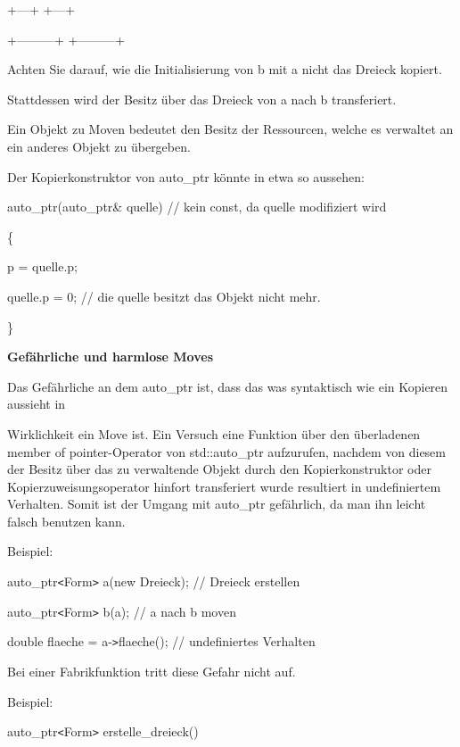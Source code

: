 \documentclass{article}
\begin{document}
\parindent=14pt
\textbar{}   +---+ \textbar{}            \textbar{}   +---+ \textbar{}  

\parindent=7pt
+---------+            +---------+

\vspace{12pt}
\parindent=0pt
Achten Sie darauf, wie die Initialisierung von b mit a nicht das Dreieck kopiert.

Stattdessen wird der Besitz über das Dreieck von a nach b transferiert.

\vspace{12pt}
Ein Objekt zu Moven bedeutet den Besitz der Ressourcen, welche es verwaltet an 
ein anderes Objekt zu übergeben.

\vspace{12pt}
Der Kopierkonstruktor von auto\_ptr könnte in etwa so aussehen:

\vspace{12pt}
auto\_ptr(auto\_ptr\& quelle) // kein const, da quelle modifiziert wird

\{    

\parindent=14pt
p = quelle.p;    

quelle.p = 0; // die quelle besitzt das Objekt nicht mehr.

\}

\vspace{12pt}
\parindent=0pt
\textbf{Gefährliche und harmlose Moves}

Das Gefährliche an dem auto\_ptr ist, dass das was syntaktisch wie ein Kopieren 
aussieht in 

Wirklichkeit ein Move ist. Ein Versuch eine Funktion über den überladenen member 
of pointer-Operator von std::auto\_ptr aufzurufen, nachdem von diesem der Besitz 
über das zu verwaltende Objekt durch den Kopierkonstruktor oder Kopierzuweisungsoperator 
hinfort transferiert wurde resultiert in undefiniertem Verhalten. Somit ist der 
Umgang mit auto\_ptr gefährlich, da man ihn leicht falsch benutzen kann.

Beispiel:

auto\_ptr\texttt{<}Form\texttt{>} a(new Dreieck); // Dreieck erstellen

auto\_ptr\texttt{<}Form\texttt{>} b(a);         // a nach b moven

double flaeche = a-\texttt{>}flaeche();  // undefiniertes Verhalten

Bei einer Fabrikfunktion tritt diese Gefahr nicht auf.

Beispiel:

auto\_ptr\texttt{<}Form\texttt{>} erstelle\_dreieck()
\end{document}
